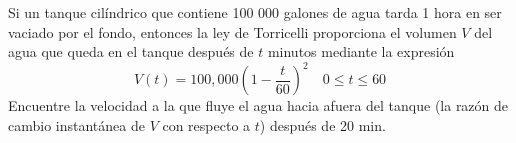 \item Si un tanque cilíndrico que contiene 100 000 galones de agua tarda 1 hora en ser vaciado por el fondo, entonces la ley de Torricelli proporciona el volumen $V$ del agua que queda en el tanque después de $t$ minutos mediante la expresión
    $$V(t) = 100,000 \left(1 - \frac{t}{60}\right)^2 \quad 0 \le t \le 60$$
    Encuentre la velocidad a la que fluye el agua hacia afuera del tanque (la razón de cambio instantánea de $V$ con respecto a $t$) después de 20 min.
